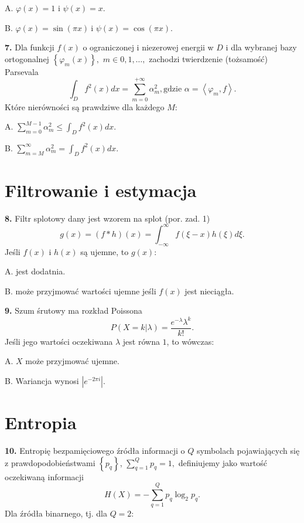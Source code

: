 \documentclass[journal,9pt,final,a4paper]{IEEEtran}%
\begin{document}
A. $\varphi\left(  x\right)  =1$ i $\psi\left(  x\right)  =x.$

B. $\varphi\left(  x\right)  =\sin\left(  \pi x\right)  \mathbf{\ }$i
$\psi\left(  x\right)  =\cos\left(  \pi x\right)  .$

\vspace*{0.25in}\textbf{7. }Dla funkcji $f\left(  x\right)  $ o ograniczonej i
niezerowej energii w $D$ i dla wybranej bazy ortogonalnej $\left\{
\varphi_{m}\left(  x\right)  \right\}  ,$ $m\in0,1,\ldots\mathbf{,}$ zachodzi
twierdzenie (tożsamość) Parsevala%
\[
\int_{D}f^{2}\left(  x\right)  dx=\sum_{m=0}^{+\infty}\alpha_{m}^{2},\text{
gdzie }\alpha=\left\langle \varphi_{m},f\right\rangle .
\]
Które nierówności są prawdziwe dla każdego $M$:

A. $\sum_{m=0}^{M-1}\alpha_{m}^{2}\leq\int_{D}f^{2}\left(  x\right)  dx.$

B. $\sum_{m=M}^{\infty}\alpha_{m}^{2}=\int_{D}f^{2}\left(  x\right)  dx.$

\section{Filtrowanie i estymacja}

\textbf{8. }Filtr splotowy dany jest wzorem na splot (por. zad. 1)
\[
g\left(  x\right)  =\left(  f\ast h\right)  \left(  x\right)  =\int_{-\infty
}^{\infty}f\left(  \xi-x\right)  h\left(  \xi\right)  d\xi.
\]
Jeśli $f\left(  x\right)  $ i $h\left(  x\right)  $ są ujemne, to
$g\left(  x\right)  $:

A. jest dodatnia.

B. może przyjmować wartości ujemne jeśli $f\left(  x\right)  $
jest nieciągła.

\vspace*{0.25in}\textbf{9. }Szum śrutowy ma rozkład Poissona%
\[
P\left(  X=k\left\vert \lambda\right.  \right)  =\frac{e^{-\lambda}\lambda
^{k}}{k!}.
\]
Jeśli jego wartości oczekiwana $\lambda$ jest równa $1$, to wówczas:

A. $X$ może przyjmować ujemne.

B. Wariancja wynosi $\left\vert e^{-2\pi i}\right\vert $.

\section{Entropia}

\textbf{10. }Entropię bezpamięciowego źródła informacji o
$Q$ symbolach pojawiających się z prawdopodobieństwami $\left\{
p_{q}\right\}  $, $\sum_{q=1}^{Q}p_{q}=1,$ definiujemy jako wartość
oczekiwaną informacji%
\[
H\left(  X\right)  =-\sum_{q=1}^{Q}p_{q}\log_{2}p_{q}.
\]
Dla źródła binarnego, tj. dla $Q=2$:
\end{document}
